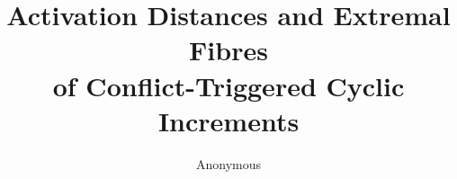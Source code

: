 \documentclass[a4paper,10pt]{amsart}
\title[Conflict-triggered cyclic increments]{Activation Distances and Extremal Fibres\protect\\ of Conflict-Triggered Cyclic Increments}
\author{Anonymous}
\date{}
\begin{document}
\begin{abstract}

\end{abstract}
\maketitle






\end{document}
